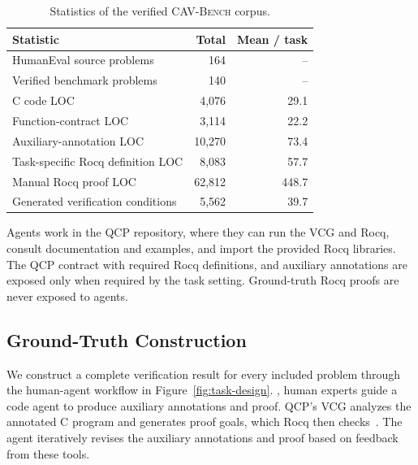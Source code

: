 \begin{table}[t]
\centering
\scriptsize
\setlength{\tabcolsep}{4pt}
\caption{Statistics of the verified \textsc{CAV-Bench} corpus.}
\label{tab:benchmark-components}
\begin{tabular}{L{0.50\columnwidth}rr}
\toprule
{}
Statistic & Total & Mean / task \\
\midrule
HumanEval source problems & 164 & -- \\
Verified benchmark problems & 140 & -- \\
C code LOC & 4,076 & 29.1 \\
Function-contract LOC & 3,114 & 22.2 \\
Auxiliary-annotation LOC & 10,270 & 73.4 \\
Task-specific Rocq definition LOC & 8,083 & 57.7 \\
Manual Rocq proof LOC & 62,812 & 448.7 \\
Generated verification conditions & 5,562 & 39.7 \\
\bottomrule
\end{tabular}
\end{table}


Agents work in the QCP repository, where they can run the VCG and Rocq, consult documentation and examples, and import
the provided Rocq libraries. The QCP contract with required Rocq definitions, and auxiliary annotations are exposed only when
required by the task setting. Ground-truth Rocq proofs are never exposed to agents.

\subsection{Ground-Truth Construction}
\label{sec:human-loop-workflow}

We construct a complete verification result for every included problem through the human-agent workflow in Figure~\ref{fig:task-design}. , human experts guide a code agent to produce auxiliary annotations and proof. QCP's VCG analyzes the annotated C program and generates proof goals, which Rocq then checks~\cite{wu2025qcppracticalseparationlogicbased}. The agent iteratively revises the auxiliary annotations and proof based on feedback from these tools.

